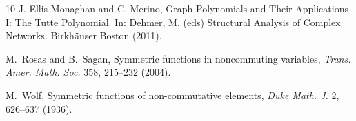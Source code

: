 \documentclass[12pt]{amsart}  %
\theoremstyle{definition}
\theoremstyle{remark}
\numberwithin{equation}{section}
\begin{document}
\begin{thebibliography}{10}
 J. Ellis-Monaghan and C. Merino, Graph Polynomials and Their Applications I: The Tutte Polynomial. In: Dehmer, M. (eds) Structural Analysis of Complex Networks. Birkh\"{a}user Boston (2011). 





 M.~Rosas and B.~Sagan, Symmetric functions in noncommuting variables, \emph{Trans. Amer. Math. Soc.} 358,  215--232 {(2004).}


%
%
%

 M.~Wolf, Symmetric functions of non-commutative elements, \emph{Duke Math. J.}  2, 626--637 (1936).

\end{thebibliography}
\end{document}
